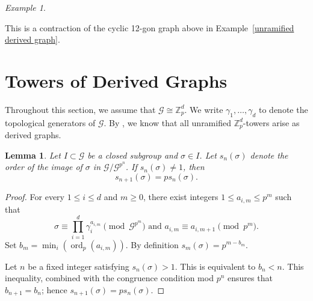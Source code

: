 \documentclass{amsart}
\newtheorem{lemma}[theorem]{Lemma}
\numberwithin{equation}{section}
\theoremstyle{remark}
\newtheorem{example}[theorem]{Example}
\newcommand{\ord}{\operatorname{ord}}
\newcommand{\Z}{\mathbb{Z}}
\newcommand{\cG}{\mathcal{G}}
\theoremstyle{plain} %
\begin{document}
\begin{example}
\begin{center}
\end{center}
This is a contraction of the cyclic 12-gon graph above in Example~\ref{unramified derived graph}.
\end{example}

\section{Towers of Derived Graphs}
\label{sec: towers of derived graphs}

Throughout this section, we assume that $\mathcal{G}\cong \Z_p^d$.
{We write $\gamma_1, \ldots, \gamma_d$ to denote the topological generators of $\cG$.}
By \cite[p.~1336]{dubose-vallieres}, we know that all unramified $\Z_p^d$-towers arise as derived graphs.



\begin{lemma}
\label{groups}
Let $I\subset \mathcal{G}$ be a closed subgroup {and $\sigma\in I$}.
Let $s_n(\sigma)$ denote the order of the image of $\sigma$ in $\mathcal{G}/\mathcal{G}^{p^n}$.
If $s_n(\sigma)\neq 1$, then \[s_{n+1}(\sigma)=ps_n(\sigma).
\]
\end{lemma} 

\begin{proof}
For every $1 \le i \le d$ and $m\geq 0$, there exist integers $1 \leq a_{i,m} \leq  p^m$ such that 
\[\sigma\equiv \prod_{i=1}^d\gamma_i^{a_{i,m}}\pmod{ \mathcal{G}^{p^m}} \textrm{ and } a_{i,m}\equiv a_{i,m+1}\pmod {p^{m}}.
\]
Set $b_m=\min_i(\ord_p(a_{i,m}))$.
By definition $s_m(\sigma)=p^{m-b_m}$.

Let $n$ be a fixed integer satisfying $s_n(\sigma)>1$.
This is equivalent to $b_n<n$.
This inequality, combined with the congruence condition mod ${p^{n}}$ ensures that $b_{n+1}=b_n$; hence $s_{n+1}(\sigma)=ps_n(\sigma)$. 
\end{proof}
\end{document}
